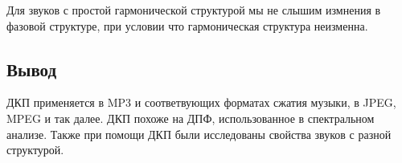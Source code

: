 Для звуков с простой гармонической структурой мы не слышим измнения в фазовой структуре, при условии что гармоническая структура неизменна.


\subsection{Вывод}

ДКП применяется в MP3 и соответвующих форматах сжатия музыки, в JPEG, MPEG и так далее. ДКП похоже на ДПФ, использованное в спектральном анализе. Также при помощи ДКП были исследованы свойства звуков с разной структурой.